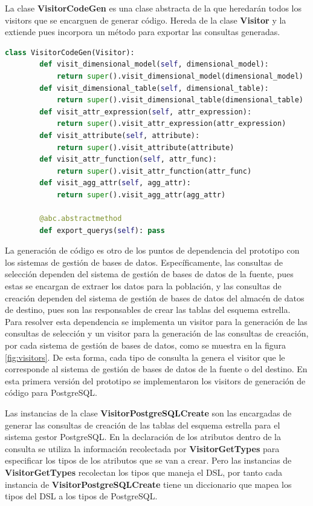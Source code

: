 La clase \textbf{VisitorCodeGen} es una clase abstracta de la que heredar\'an todos los visitors que 
se encarguen de generar código. Hereda de la clase \textbf{Visitor} y la extiende pues incorpora un 
método para exportar las consultas generadas.

\begin{lstlisting}[label={code:vcodegen}, caption={Clase VisitorCodeGen}, language={python}]
    class VisitorCodeGen(Visitor):
        def visit_dimensional_model(self, dimensional_model):
            return super().visit_dimensional_model(dimensional_model)
        def visit_dimensional_table(self, dimensional_table):
            return super().visit_dimensional_table(dimensional_table)
        def visit_attr_expression(self, attr_expression):
            return super().visit_attr_expression(attr_expression)
        def visit_attribute(self, attribute):
            return super().visit_attribute(attribute)
        def visit_attr_function(self, attr_func):
            return super().visit_attr_function(attr_func)
        def visit_agg_attr(self, agg_attr):
            return super().visit_agg_attr(agg_attr)

        @abc.abstractmethod
        def export_querys(self): pass
\end{lstlisting}

La generación de código es otro de los puntos de dependencia del prototipo con los sistemas de gestión 
de bases de datos. Específicamente, las consultas de selección dependen del sistema de gestión de bases 
de datos de la fuente, pues estas se encargan de extraer los datos para la población, y las consultas 
de creación dependen del sistema de gestión de bases de datos del almacén de datos de destino, pues 
son las responsables de crear las tablas del esquema estrella. Para resolver esta dependencia 
se implementa un visitor para la generación de las consultas de selección y un visitor para la generación 
de las consultas de creación, por cada sistema de gestión de bases de datos, como se muestra en la 
figura \ref{fig:visitors}. De esta forma, cada tipo de consulta la genera el visitor que le corresponde 
al sistema de gestión de bases de datos de la fuente o del destino. En esta primera versión del prototipo 
se implementaron los visitors de generación de código para PostgreSQL.

Las instancias de la clase \textbf{VisitorPostgreSQLCreate} son las encargadas de generar las 
consultas de creación de las tablas del esquema estrella para el sistema gestor PostgreSQL. En la 
declaración de los atributos 
dentro de la consulta se utiliza la información recolectada por \textbf{VisitorGetTypes} para 
especificar los tipos de los atributos que se van a crear. Pero las instancias de \textbf{VisitorGetTypes} 
recolectan los tipos que maneja el DSL, por tanto cada instancia de \textbf{VisitorPostgreSQLCreate} 
tiene un diccionario que mapea los tipos del DSL a los tipos de PostgreSQL.

